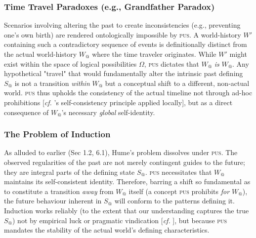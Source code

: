 \documentclass[11pt, a4paper]{article}
\makeatletter
\newcommand{\pus}{\textsc{pus}} %
\newcommand{\Wactual}{W_{@}} %
\newcommand{\Sactual}{S_{@}} %
\newcommand{\Omegaset}{\Omega} %
\makeatother
\begin{document}
\subsubsection{Time Travel Paradoxes (e.g., Grandfather Paradox)}
Scenarios involving altering the past to create inconsistencies (e.g., preventing one's own birth) are rendered ontologically impossible by \pus. A world-history $W'$ containing such a contradictory sequence of events is definitionally distinct from the actual world-history $\Wactual$ where the time traveler originates. While $W'$ might exist within the space of logical possibilities $\Omegaset$, \pus{} dictates that $\Wactual$ \textit{is} $\Wactual$. Any hypothetical "travel" that would fundamentally alter the intrinsic past defining $\Sactual$ is not a transition \textit{within} $\Wactual$ but a conceptual shift to a different, non-actual world. \pus{} thus upholds the consistency of the actual timeline not through ad-hoc prohibitions [\textit{cf.} \citealp{novikov1990}'s self-consistency principle applied locally], but as a direct consequence of $\Wactual$'s necessary \textit{global} self-identity.

\subsubsection{The Problem of Induction}
As alluded to earlier (Sec 1.2, 6.1), Hume's problem dissolves under \pus. The observed regularities of the past are not merely contingent guides to the future; they are integral parts of the defining state $\Sactual$. \pus{} necessitates that $\Wactual$ maintains its self-consistent identity. Therefore, barring a shift so fundamental as to constitute a transition \textit{away} from $\Wactual$ itself (a concept \pus{} prohibits \textit{for $\Wactual$}), the future behaviour inherent in $\Sactual$ will conform to the patterns defining it. Induction works reliably (to the extent that our understanding captures the true $\Sactual$) not by empirical luck or pragmatic vindication [\textit{cf.} \citealp{reichenbach1938}], but because \pus{} mandates the stability of the actual world's defining characteristics.
\end{document}
